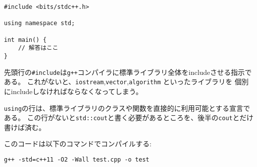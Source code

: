 \begin{comment}
\begin{lstlisting}
#include <bits/stdc++.h>

using namespace std;

int main() {
    // solution comes here
}
\end{lstlisting}
\end{comment}

\begin{lstlisting}
#include <bits/stdc++.h>

using namespace std;

int main() {
    // 解答はここ
}
\end{lstlisting}

\begin{comment}
The \texttt{\#include} line at the beginning
of the code is a feature of the \texttt{g++} compiler
that allows us to include the entire standard library.
Thus, it is not needed to separately include
libraries such as \texttt{iostream},
\texttt{vector} and \texttt{algorithm},
but rather they are available automatically.
\end{comment}

先頭行の\texttt{\#include}は\texttt{g++}コンパイラに標準ライブラリ全体をincludeさせる指示である。
これがないと、\texttt{iostream},\texttt{vector},\texttt{algorithm} といったライブラリを
個別にincludeしなければならなくなってしまう。

\begin{comment}
The \texttt{using} line declares
that the classes and functions
of the standard library can be used directly
in the code.
Without the \texttt{using} line we would have
to write, for example, \texttt{std::cout},
but now it suffices to write \texttt{cout}.
\end{comment}

\texttt{using}の行は、標準ライブラリのクラスや関数を直接的に利用可能とする宣言である。
この行がないと\texttt{std::cout}と書く必要があるところを、後半の\texttt{cout}とだけ
書けば済む。

\begin{comment}
The code can be compiled using the following command:
\end{comment}

このコードは以下のコマンドでコンパイルする:

\begin{lstlisting}
g++ -std=c++11 -O2 -Wall test.cpp -o test
\end{lstlisting}

